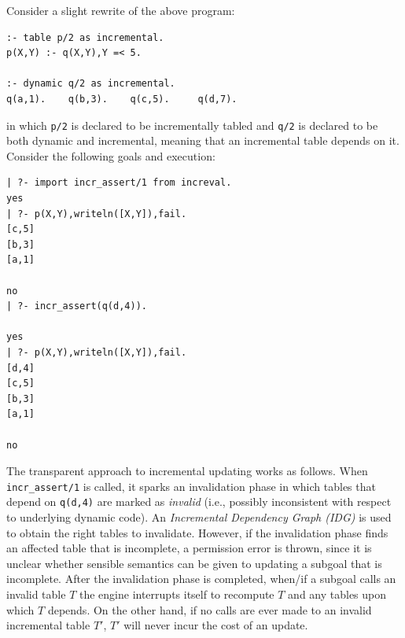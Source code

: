 %
Consider a slight rewrite of the above program:
\begin{verbatim}
:- table p/2 as incremental.
p(X,Y) :- q(X,Y),Y =< 5.

:- dynamic q/2 as incremental.
q(a,1).    q(b,3).    q(c,5).     q(d,7).
\end{verbatim}
in which {\tt p/2} is declared to be incrementally tabled
and {\tt q/2} is declared to be both dynamic and incremental, meaning
that an incremental table depends on it.
Consider the following goals and execution:
\begin{verbatim}
| ?- import incr_assert/1 from increval.
yes
| ?- p(X,Y),writeln([X,Y]),fail.
[c,5]
[b,3]
[a,1]

no
| ?- incr_assert(q(d,4)).

yes
| ?- p(X,Y),writeln([X,Y]),fail.
[d,4]
[c,5]
[b,3]
[a,1]

no
\end{verbatim}
\noindent
The transparent approach to incremental updating works as follows.
When {\tt incr\_assert/1} is called, it sparks an invalidation
phase in which tables that depend on {\tt q(d,4)} are marked as {\em
  invalid} (i.e., possibly inconsistent with respect to underlying
dynamic code).  An {\em Incremental Dependency Graph (IDG)} is used to
obtain the right tables to invalidate.  However, if the invalidation
phase finds an affected table that is incomplete, a permission error
is thrown, since it is unclear whether sensible semantics can be given
to updating a subgoal that is incomplete.  After the invalidation
phase is completed, when/if a subgoal calls an invalid table $T$ the
engine interrupts itself to recompute $T$ and any tables upon which
$T$ depends.  On the other hand, if no calls are ever made to an
invalid incremental table $T'$, $T'$ will never incur the cost of an
update.

